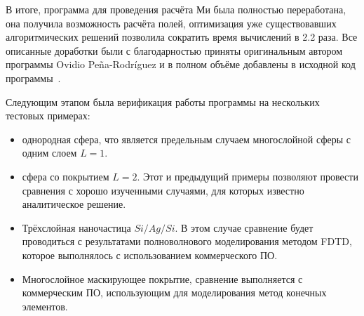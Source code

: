В итоге, программа для проведения расчёта Ми была полностью
переработана, она получила возможность расчёта полей, оптимизация уже
существовавших алгоритмических решений позволила сократить время
вычислений в 2.2 раза.  Все описанные доработки были с благодарностью
приняты оригинальным автором программы Ovidio Pe\~{n}a-Rodr\'{i}guez и
в полном объёме добавлены в исходной код программы~\cite{Scattnlay-web}.


Следующим этапом была верификация работы программы на нескольких
тестовых примерах: 
\begin{itemize}
\item однородная сфера, что является предельным случаем многослойной
  сферы с одним слоем $L=1$.
\item сфера со покрытием $L=2$. Этот и предыдущий примеры позволяют
  провести сравнения с хорошо изученными случаями, для которых
  известно аналитическое решение.
\item Трёхслойная наночастица $Si/Ag/Si$. В этом случае сравнение
  будет проводиться с результатами полноволнового моделирования
  методом FDTD,  которое выполнялось с использованием  коммерческого ПО.
\item Многослойное маскирующее покрытие, сравнение выполняется с
  коммерческим ПО, использующим для моделирования метод конечных
  элементов.
\end{itemize}

